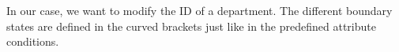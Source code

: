 {In our case, we want to modify the ID of a department. The different boundary states are defined in the curved brackets just like in the predefined attribute conditions.\newline

%
%
%
%
%
%
%
%
%
%
%
%
%
%
%
%
%
%
%
%
%

}
